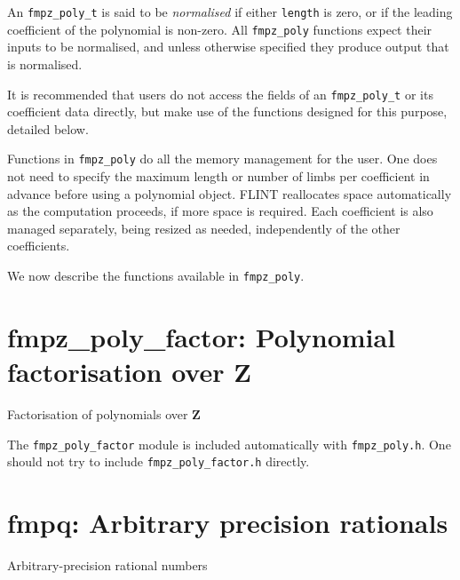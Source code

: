 \documentclass[a4paper,10pt]{book}
\newcommand{\Z}{\mathbf{Z}}%
\newcommand{\code}{\lstinline}
\begin{document}
{{An \code{fmpz_poly_t} is said to be \emph{normalised} if either
\code{length} is zero, or if the leading coefficient of the polynomial is
non-zero.  All \code{fmpz_poly} functions expect their inputs to be
normalised, and unless otherwise specified they produce output that is
normalised.

It is recommended that users do not access the fields of an
\code{fmpz_poly_t} or its coefficient data directly, but make use of the
functions designed for this purpose, detailed below.

Functions in \code{fmpz_poly} do all the memory management for the user.
One does not need to specify the maximum length or number of limbs per
coefficient in advance before using a polynomial object.  FLINT reallocates
space automatically as the computation proceeds, if more space is required.
Each coefficient is also managed separately, being resized as needed,
independently of the other coefficients.

We now describe the functions available in \code{fmpz_poly}.




\chapter{fmpz\_poly\_factor: Polynomial factorisation over $\Z$}
\epigraph{Factorisation of polynomials over $\Z$}{}

The \code{fmpz_poly_factor} module is included automatically with
\code{fmpz_poly.h}. One should not try to include \code{fmpz_poly_factor.h}
directly.




\chapter{fmpq: Arbitrary precision rationals}
\epigraph{Arbitrary-precision rational numbers}{}

}}
\end{document}
